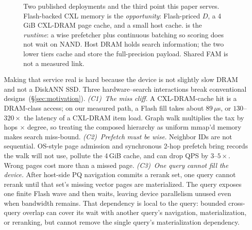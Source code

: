 \begin{figure}[t]
{}
  \caption{Two published deployments and the third point this paper serves.
    Flash-backed CXL memory is the \emph{opportunity}: Flash-priced $D$, a 4\,GiB CXL-DRAM page cache, and a small host cache.
    \sys{} is the \emph{runtime}: a wise prefetcher plus continuous batching so scoring does not wait on NAND.
    Host DRAM holds search information; the two lower tiers cache and store the full-precision payload.
    Shared FAM is not a measured link.}
  \label{fig:intro-position}
\end{figure}

Making that service real is hard because the device is not slightly slow DRAM and not a DiskANN SSD.
Three hardware--search interactions break conventional designs~(\S\ref{sec:motivation}).
\emph{(C1)~The miss cliff.}
A CXL-DRAM-cache hit is a DRAM-class access; on our measured path, a Flash fill takes about
$89\,\mu$s, or $130$--$320\times$ the latency of a CXL-DRAM item load.
Graph walk multiplies the tax by hops $\times$ degree, so treating the composed hierarchy as uniform mmap'd memory makes search miss-bound.
\emph{(C2)~Prefetch must be wise.}
Neighbor IDs are not sequential.
OS-style page admission and synchronous 2-hop prefetch bring records the walk will not use, pollute the 4\,GiB cache, and can drop QPS by $3$--$5\times$.
Wrong pages cost more than a missed page.
\emph{(C3)~One query cannot fill the device.}
After host-side PQ navigation commits a rerank set, one query cannot rerank until that set's missing vector pages are materialized.
The query exposes one finite Flash wave and then waits, leaving device parallelism unused even when bandwidth remains.
That dependency is local to the query: bounded cross-query overlap can cover its wait with another query's navigation, materialization, or reranking, but cannot remove the single query's materialization dependency.

